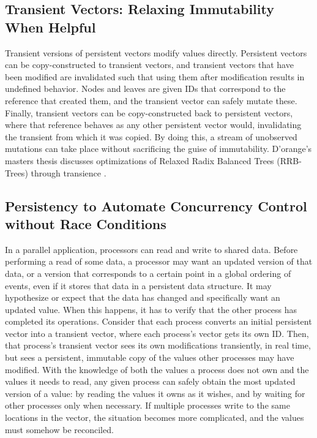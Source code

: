 \subsection{Transient Vectors: Relaxing Immutability When Helpful}
Transient versions of persistent vectors modify values directly. Persistent
vectors can be copy-constructed to transient vectors, and transient vectors that
have been modified are invalidated such that using them after modification
results in undefined behavior. Nodes and leaves are given IDs that correspond
to the reference that created them, and the transient vector can safely mutate
these. Finally, transient vectors can be copy-constructed back to persistent
vectors, where that reference behaves as any other persistent vector would,
invalidating the transient from which it was copied. By doing this, a stream of
unobserved mutations can take place without sacrificing the guise of
immutability. D'orange's masters thesis discusses optimizations of Relaxed Radix
Balanced Trees (RRB-Trees) through transience \cite{lorange2014rrb}.

\subsection{Persistency to Automate Concurrency Control without Race Conditions}
In a parallel application, processors can read and write to shared data. Before
performing a read of some data, a processor may want an updated version of that
data, or a version that corresponds to a certain point in a global ordering of
events, even if it stores that data in a persistent data structure. It may
hypothesize or expect that the data has changed and specifically want an updated
value. When this happens, it has to verify that the other process  has completed
its operations. Consider that each process converts an initial persistent vector
into a transient vector, where each process's vector gets its own ID. Then, that
process's transient vector sees its own modifications transiently, in real time,
but sees a persistent, immutable copy of the values other processes may have
modified. With the knowledge of both the values a process does not own and the
values it needs to read, any given process can safely obtain the most updated
version of a value: by reading the values it owns as it wishes, and by waiting
for other processes only when necessary. If multiple processes write to the same
locations in the vector, the situation becomes more complicated, and the values
must somehow be reconciled.

